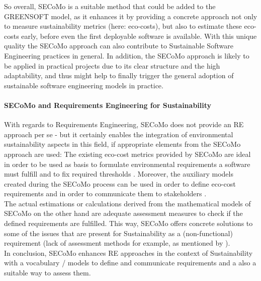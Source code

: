 \documentclass[oribibl]{llncs}
\begin{document}
So overall, SECoMo is a suitable method that could be added to the GREENSOFT model, as it enhances it by providing a concrete approach not only to measure sustainability metrics (here: eco-costs), but also to estimate these eco-costs early, before even the first deployable software is available. With this unique quality the SECoMo approach can also contribute to Sustainable Software Engineering practices in general. %
In addition, the SECoMo approach is likely to be applied in practical projects due to its clear structure and the high adaptability, and thus might help to finally trigger the general adoption of sustainable software engineering models in practice.


\paragraph{SECoMo and Requirements Engineering for Sustainability}
With regards to Requirements Engineering, SECoMo does not provide an RE approach per se - but it certainly enables the integration of environmental sustainability aspects in this field, if appropriate elements from the SECoMo approach are used: The existing eco-cost metrics provided by SECoMo are ideal in order to be used as basis to formulate environmental requirements a software must fulfill and to fix required thresholds \cite{schulze_cost_2016}. Moreover, the auxiliary models created during the SECoMo process can be used in order to define eco-cost requirements and in order to communicate them to stakeholders \cite{schulze_cost_2016}.\\
The actual estimations or calculations derived from the mathematical models of SECoMo on the other hand are adequate assessment measures to check if the defined requirements are fulfilled. This way, SECoMo offers concrete solutions to some of the issues that are present for Sustainability as a (non-functional) requirement (lack of assessment methods for example, as mentioned by \cite{penzenstadler_safety_2014}).\\
In conclusion, SECoMo enhances RE approaches in the context of Sustainability with a vocabulary / models to define and communicate requirements and a also a suitable way to assess them.
\end{document}
